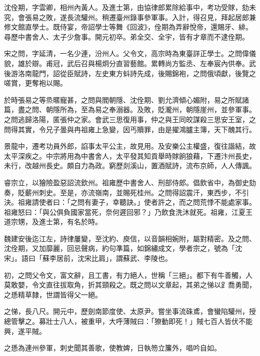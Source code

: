 \begin{pinyinscope}
 沈佺期，字雲卿，相州內黃人。及進士第，由協律郎累除給事中，考功受賕，劾未究，會張易之敗，遂長流驩州。稍遷臺州錄事參軍事。入計，得召見，拜起居郎兼修文館直學士。既侍宴，帝詔學士等舞《回波》，佺期為弄辭悅帝，還賜牙、緋。尋歷中書舍人、太子少詹事。開元初卒。弟全交、全宇，皆有才章而不逮佺期。



 宋之問，字延清，一名少連，汾州人。父令文，高宗時為東臺詳正學士。之問偉儀貌，雄於辯。甫冠，武后召與楊炯分直習藝館。累轉尚方監丞、左奉宸內供奉。武後游洛南龍門，詔從臣賦詩，左史東方蚪詩先成，後賜錦袍，之問俄頃獻，後覽之嗟賞，更奪袍以賜。



 於時張易之等烝暱寵甚，之問與閻朝隱、沈佺期、劉允濟傾心媚附，易之所賦諸篇，盡之問、朝隱所為，至為易之奉溺器。及敗，貶瀧州，朝隱崖州，並參軍事。之問逃歸洛陽，匿張仲之家。會武三思復用事，仲之與王同皎謀殺三思安王室，之問得其實，令兄子曇與冉祖雍上急變，因丐贖罪，由是擢鴻臚主簿，天下醜其行。



 景龍中，遷考功員外郎，諂事太平公主，故見用。及安樂公主權盛，復往諧結，故太平深疾之。中宗將用為中書舍人，太平發其知貢舉時賕餉狼藉，下遷汴州長史，未行，改越州長史。頗自力為政。窮歷剡溪山，置酒賦詩，流布京師，人人傳諷。



 睿宗立，以獪險盈惡詔流欽州。祖雍歷中書舍人、刑部侍郎。倡飲省中，為御史劾奏，貶蘄州刺史。至是，亦流嶺南，並賜死桂州。之問得詔震汗，東西步，不引決。祖雍請使者曰：「之問有妻子，幸聽訣。」使者許之，而之問荒悸不能處家事。祖雍怒曰：「與公俱負國家當死，奈何遲回邪？」乃飲食洗沐就死。祖雍，江夏王道宗甥，及進士第，有名於時。



 魏建安後迄江左，詩律屢變，至沈約、庾信，以音韻相婉附，屬對精密。及之問、沈佺期，又加靡麗，回忌聲病，約句準篇，如錦繡成文，學者宗之，號為「沈宋」。語曰「蘇李居前，沈宋比肩」，謂蘇武、李陵也。



 初，之問父令文，富文辭，且工書，有力絕人，世稱「三絕」。都下有牛善觸，人莫敢嬰，令文直往拔取角，折其頸殺之。既之問以文章起，其弟之悌以𧾷喬勇聞，之愻精草隸，世謂皆得父一絕。



 之悌，長八尺。開元中，歷劍南節度使、太原尹。嘗坐事流硃鳶，會蠻陷驩州，授總管擊之。募壯士八人，被重甲，大呼薄賊曰：「獠動即死！」賊七百人皆伏不能興，遂平賊。



 之愻為連州參軍，刺史聞其善歌，使教婢，日執笏立簾外，唱吟自如。




\end{pinyinscope}
